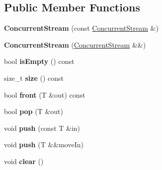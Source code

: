 \subsection*{Public Member Functions}
\begin{DoxyCompactItemize}
\item 
\hypertarget{class_d_x_1_1_lock_free_1_1_concurrent_stream_a5e9ee519ec757e4fa5e87df6aa466bc1}{{\bfseries Concurrent\-Stream} (const \hyperlink{class_d_x_1_1_lock_free_1_1_concurrent_stream}{Concurrent\-Stream} \&)}\label{class_d_x_1_1_lock_free_1_1_concurrent_stream_a5e9ee519ec757e4fa5e87df6aa466bc1}

\item 
\hypertarget{class_d_x_1_1_lock_free_1_1_concurrent_stream_a3deff0f2eb5ea3e9c3388c4fa52f9b85}{{\bfseries Concurrent\-Stream} (\hyperlink{class_d_x_1_1_lock_free_1_1_concurrent_stream}{Concurrent\-Stream} \&\&)}\label{class_d_x_1_1_lock_free_1_1_concurrent_stream_a3deff0f2eb5ea3e9c3388c4fa52f9b85}

\item 
\hypertarget{class_d_x_1_1_lock_free_1_1_concurrent_stream_aed04a552a34567af1d8fb878ee45c560}{bool {\bfseries is\-Empty} () const }\label{class_d_x_1_1_lock_free_1_1_concurrent_stream_aed04a552a34567af1d8fb878ee45c560}

\item 
\hypertarget{class_d_x_1_1_lock_free_1_1_concurrent_stream_a320844912e423dfb318ba91335ac25f6}{size\-\_\-t {\bfseries size} () const }\label{class_d_x_1_1_lock_free_1_1_concurrent_stream_a320844912e423dfb318ba91335ac25f6}

\item 
\hypertarget{class_d_x_1_1_lock_free_1_1_concurrent_stream_aa0205ac58036a4f24338be5203e4401c}{bool {\bfseries front} (T \&out) const }\label{class_d_x_1_1_lock_free_1_1_concurrent_stream_aa0205ac58036a4f24338be5203e4401c}

\item 
\hypertarget{class_d_x_1_1_lock_free_1_1_concurrent_stream_afb5efcb0b628590c44fa837cdb5ab2ae}{bool {\bfseries pop} (T \&out)}\label{class_d_x_1_1_lock_free_1_1_concurrent_stream_afb5efcb0b628590c44fa837cdb5ab2ae}

\item 
\hypertarget{class_d_x_1_1_lock_free_1_1_concurrent_stream_ac4c611d386c3de1f6831208f61bb9c33}{void {\bfseries push} (const T \&in)}\label{class_d_x_1_1_lock_free_1_1_concurrent_stream_ac4c611d386c3de1f6831208f61bb9c33}

\item 
\hypertarget{class_d_x_1_1_lock_free_1_1_concurrent_stream_a3f554a07f630e9d3f39ca99bcd46a952}{void {\bfseries push} (T \&\&move\-In)}\label{class_d_x_1_1_lock_free_1_1_concurrent_stream_a3f554a07f630e9d3f39ca99bcd46a952}

\item 
\hypertarget{class_d_x_1_1_lock_free_1_1_concurrent_stream_aa137361af8ac8f1691d76ff2e3f227cc}{void {\bfseries clear} ()}\label{class_d_x_1_1_lock_free_1_1_concurrent_stream_aa137361af8ac8f1691d76ff2e3f227cc}

\end{DoxyCompactItemize}
